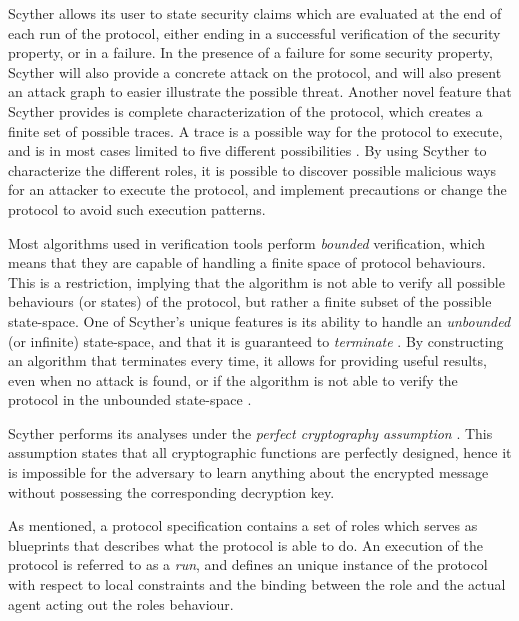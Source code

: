 Scyther allows its user to state security claims which are evaluated at the end of each run of the protocol, either ending in a successful verification of the security property, or in a failure. In the presence of a failure for some security property, Scyther will also provide a concrete attack on the protocol, and will also present an attack graph to easier illustrate the possible threat. Another novel feature that Scyther provides is complete characterization of the protocol, which creates a finite set of possible traces. A trace is a possible way for the protocol to execute, and is in most cases limited to five different possibilities \cite{cremers2008scyther}. By using Scyther to characterize the different roles, it is possible to discover possible malicious ways for an attacker to execute the protocol, and implement precautions or change the protocol to avoid such execution patterns.






Most algorithms used in verification tools perform \emph{bounded} verification, which means that they are capable of handling a finite space of protocol behaviours. This is a restriction, implying that the algorithm is not able to verify all possible behaviours (or states) of the protocol, but rather a finite subset of the possible state-space. One of Scyther's unique features is its ability to handle an \emph{unbounded} (or infinite) state-space, and that it is guaranteed to \emph{terminate} \cite{cremers2008unbounded}. By constructing an algorithm that terminates every time, it allows for providing useful results, even when no attack is found, or if the algorithm is not able to verify the protocol in the unbounded state-space \cite{cremers2008scyther}.

Scyther performs its analyses under the \emph{perfect cryptography assumption} \cite{cremers2008unbounded}. This assumption states that all cryptographic functions are perfectly designed, hence it is impossible for the adversary to learn anything about the encrypted message without possessing the corresponding decryption key.



As mentioned, a protocol specification contains a set of roles which serves as blueprints that describes what the protocol is able to do. An execution of the protocol is referred to as a \emph{run}, and defines an unique instance of the protocol with respect to local constraints and the binding between the role and the actual agent acting out the roles behaviour. 

